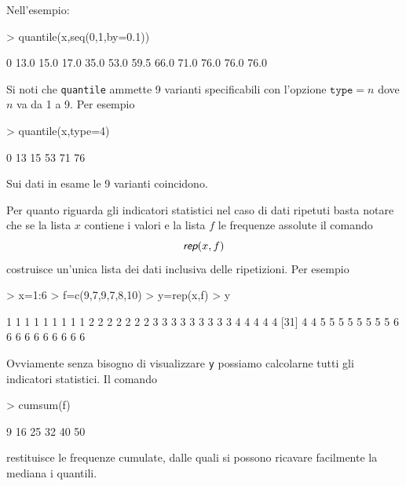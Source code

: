 \documentclass[onecolumn,12pt]{book}
\newcommand{\varia}[1]{\textsl{\textsf{#1}}}
\begin{document}
\begin{itemize}
Nell'esempio:
\begin{Schunk}
\begin{Sinput}
> quantile(x,seq(0,1,by=0.1))
\end{Sinput}
\begin{Soutput}
  0%
13.0 15.0 17.0 35.0 53.0 59.5 66.0 71.0 76.0 76.0 76.0 
\end{Soutput}
\end{Schunk}
Si noti che \texttt{quantile} ammette 9 varianti specificabili con l'opzione $\texttt{type}=n$ dove $n$ va da 1 a 9.
Per esempio
\begin{Schunk}
\begin{Sinput}
> quantile(x,type=4)
\end{Sinput}
\begin{Soutput}
  0%
  13   15   53   71   76 
\end{Soutput}
\end{Schunk}
Sui dati in esame le 9 varianti coincidono.
\end{itemize}
Per quanto riguarda gli indicatori statistici nel caso di dati ripetuti basta notare che se la lista $x$ contiene i valori e la lista $f$ le frequenze assolute il comando
$$\varia{rep}(x,f)$$ costruisce un'unica lista dei dati inclusiva delle ripetizioni.
Per esempio

\begin{Schunk}
\begin{Sinput}
> x=1:6
> f=c(9,7,9,7,8,10)
> y=rep(x,f)
> y
\end{Sinput}
\begin{Soutput}
 [1] 1 1 1 1 1 1 1 1 1 2 2 2 2 2 2 2 3 3 3 3 3 3 3 3 3 4 4 4 4 4
[31] 4 4 5 5 5 5 5 5 5 5 6 6 6 6 6 6 6 6 6 6
\end{Soutput}
\end{Schunk}
Ovviamente senza bisogno di visualizzare \texttt{y} possiamo calcolarne tutti gli indicatori statistici.
Il comando
\begin{Schunk}
\begin{Sinput}
> cumsum(f)
\end{Sinput}
\begin{Soutput}
[1]  9 16 25 32 40 50
\end{Soutput}
\end{Schunk}
restituisce le frequenze cumulate, dalle quali si possono ricavare facilmente la mediana
i quantili.
\end{document}
